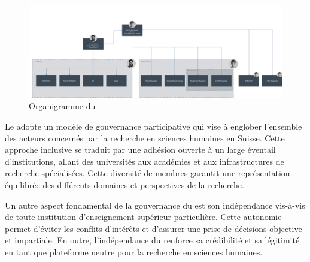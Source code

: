         \begin{figure}[h!]
            \centering
            \includegraphics[width=12cm]{02_images/part_01/02_executive_board.jpg}
            \caption{Organigramme du \dsc}
        \end{figure}


        Le \dsc adopte un modèle de gouvernance participative qui vise à englober l'ensemble des acteurs concernés par la recherche en sciences humaines en Suisse. Cette approche inclusive se traduit par une adhésion ouverte à un large éventail d'institutions, allant des universités aux académies et aux infrastructures de recherche spécialisées. Cette diversité de membres garantit une représentation équilibrée des différents domaines et perspectives de la recherche.

        Un autre aspect fondamental de la gouvernance du \dsc est son indépendance vis-à-vis de toute institution d'enseignement supérieur particulière. Cette autonomie permet d'éviter les conflits d'intérêts et d'assurer une prise de décisions objective et impartiale. En outre, l'indépendance du \dsc renforce sa crédibilité et sa légitimité en tant que plateforme neutre pour la recherche en sciences humaines.

